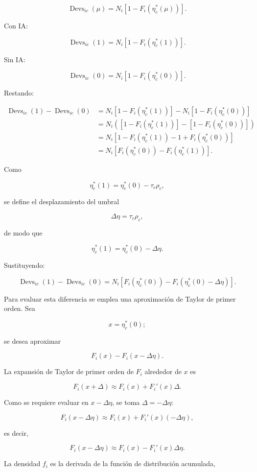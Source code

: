 \documentclass[12pt,a4paper]{article}
\newcommand{\Devs}{\operatorname{Devs}}
\begin{document}
\[
\Devs_{ic}(\mu)=N_i\left[1-F_i(\eta_c^*(\mu))\right].
\]

Con IA:

\[
\Devs_{ic}(1)=N_i\left[1-F_i(\eta_c^*(1))\right].
\]

Sin IA:

\[
\Devs_{ic}(0)=N_i\left[1-F_i(\eta_c^*(0))\right].
\]

Restando:

\begin{align*}
\Devs_{ic}(1)-\Devs_{ic}(0)
&=
N_i\left[1-F_i(\eta_c^*(1))\right]
-
N_i\left[1-F_i(\eta_c^*(0))\right]\\
&=
N_i\left(
\left[1-F_i(\eta_c^*(1))\right]
-
\left[1-F_i(\eta_c^*(0))\right]
\right)\\
&=
N_i\left[
1-F_i(\eta_c^*(1))-1+F_i(\eta_c^*(0))
\right]\\
&=
N_i\left[
F_i(\eta_c^*(0))-F_i(\eta_c^*(1))
\right].
\end{align*}

Como

\[
\eta_c^*(1)=\eta_c^*(0)-\tau_c\rho_c,
\]

se define el desplazamiento del umbral

\[
\Delta\eta=\tau_c\rho_c,
\]

de modo que

\[
\eta_c^*(1)=\eta_c^*(0)-\Delta\eta.
\]

Sustituyendo:

\[
\Devs_{ic}(1)-\Devs_{ic}(0)
=
N_i\left[
F_i(\eta_c^*(0))
-F_i(\eta_c^*(0)-\Delta\eta)
\right].
\]

Para evaluar esta diferencia se emplea una aproximación de Taylor de primer orden. Sea

\[
x=\eta_c^*(0);
\]

se desea aproximar

\[
F_i(x)-F_i(x-\Delta\eta).
\]

La expansión de Taylor de primer orden de $F_i$ alrededor de $x$ es

\[
F_i(x+\Delta)\approx F_i(x)+F_i'(x)\Delta.
\]

Como se requiere evaluar en $x-\Delta\eta$, se toma $\Delta=-\Delta\eta$:

\[
F_i(x-\Delta\eta)
\approx
F_i(x)+F_i'(x)(-\Delta\eta),
\]

es decir,

\[
F_i(x-\Delta\eta)
\approx
F_i(x)-F_i'(x)\Delta\eta.
\]

La densidad $f_i$ es la derivada de la función de distribución acumulada,
\end{document}
